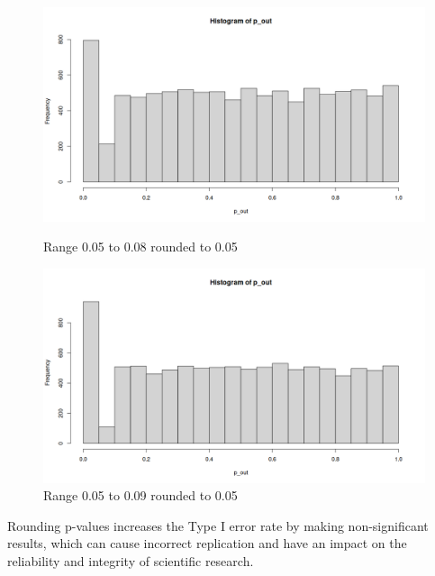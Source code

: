 \documentclass{article}
\begin{document}
\begin{figure}[h!]
    \begin{minipage}{0.45\textwidth}
        \centering
        \includegraphics[width=\textwidth]{Assignment1/p-round/08.png}
        \caption{Range 0.05 to 0.08 rounded to 0.05}
    \end{minipage} \hfill
    \begin{minipage}{0.45\textwidth}
        \centering
        \includegraphics[width=\textwidth]{Assignment1/p-round/09.png}
        \caption{Range 0.05 to 0.09 rounded to 0.05}
    \end{minipage}
\end{figure}

Rounding p-values increases the Type I error rate by making non-significant results, which can cause incorrect replication and have an impact on the reliability and integrity of scientific research.





\end{document}
